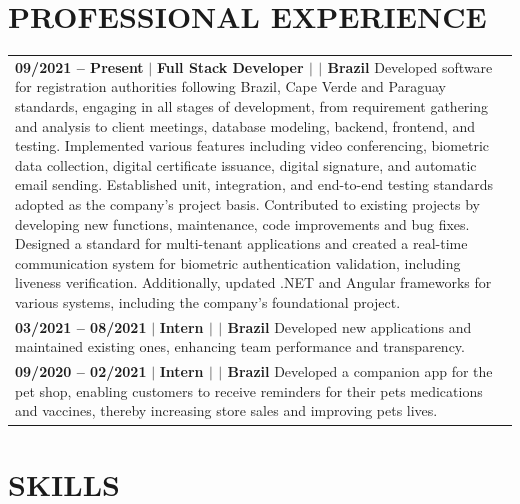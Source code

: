 \documentclass[letterpaper,11pt]{article}
\begin{document}
\section{PROFESSIONAL EXPERIENCE}
{
    \begin{tabularx}{\textwidth}{@{}X@{}}
        {
            \textbf{09/2021 -- Present} $\vert$ \textbf{Full Stack Developer $\vert$ \href{https://www.lacunasoftware.com/}{\color{blue}{Lacuna Software}} $\vert$ Brazil} \newline
            Developed software for registration authorities following Brazil, Cape Verde and Paraguay standards, engaging in all stages of development, from requirement gathering and analysis to client meetings, database modeling, backend, frontend, and testing. Implemented various features including video conferencing, biometric data collection, digital certificate issuance, digital signature, and automatic email sending. Established unit, integration, and end-to-end testing standards adopted as the company's project basis. Contributed to existing projects by developing new functions, maintenance, code improvements and bug fixes. Designed a standard for multi-tenant applications and created a real-time communication system for biometric authentication validation, including liveness verification. Additionally, updated .NET and Angular frameworks for various systems, including the company's foundational project.
        } \\
        {
            \textbf{03/2021 -- 08/2021} $\vert$ \textbf{Intern $\vert$ \href{https://portal.tcu.gov.br/inicio/}{\color{blue}{Federal Court of Accounts (TCU)}} $\vert$ Brazil} \newline
            Developed new applications and maintained existing ones, enhancing team performance and transparency.
        } \\
        {
            \textbf{09/2020 -- 02/2021} $\vert$ \textbf{Intern $\vert$ \href{https://www.companhiadaterra.com/}{\color{blue}{Companhia da Terra}} $\vert$ Brazil} \newline
            Developed a companion app for the pet shop, enabling customers to receive reminders for their pets medications and vaccines, thereby increasing store sales and improving pets lives.
        } \\
    \end{tabularx}
}


\section{SKILLS}
\end{document}
